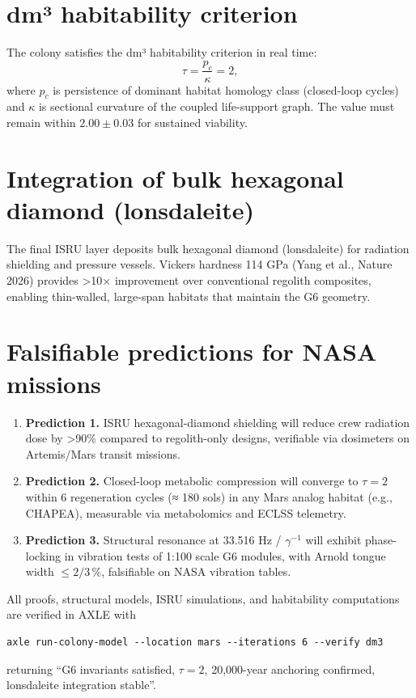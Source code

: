 \documentclass[19pt]{book}
\theoremstyle{plain}
\theoremstyle{definition}
\theoremstyle{remark}
\begin{document}
\section{dm³ habitability criterion}

The colony satisfies the dm³ habitability criterion in real time:
\[
\tau = \frac{p_c}{\kappa} = 2,
\]
where \(p_c\) is persistence of dominant habitat homology class (closed-loop cycles) and \(\kappa\) is sectional curvature of the coupled life-support graph. The value must remain within \(2.00 \pm 0.03\) for sustained viability.

\section{Integration of bulk hexagonal diamond (lonsdaleite)}

The final ISRU layer deposits bulk hexagonal diamond (lonsdaleite) for radiation shielding and pressure vessels. Vickers hardness 114 GPa (Yang et al., Nature 2026) provides >10× improvement over conventional regolith composites, enabling thin-walled, large-span habitats that maintain the G6 geometry.

\section{Falsifiable predictions for NASA missions}

\begin{enumerate}
\item \textbf{Prediction 1.} ISRU hexagonal-diamond shielding will reduce crew radiation dose by >90\% compared to regolith-only designs, verifiable via dosimeters on Artemis/Mars transit missions.
\item \textbf{Prediction 2.} Closed-loop metabolic compression will converge to \(\tau = 2\) within 6 regeneration cycles (≈ 180 sols) in any Mars analog habitat (e.g., CHAPEA), measurable via metabolomics and ECLSS telemetry.
\item \textbf{Prediction 3.} Structural resonance at 33.516 Hz / \(\gamma^{-1}\) will exhibit phase-locking in vibration tests of 1:100 scale G6 modules, with Arnold tongue width \(\le 2/3\,\%\), falsifiable on NASA vibration tables.
\end{enumerate}

All proofs, structural models, ISRU simulations, and habitability computations are verified in AXLE with
\begin{verbatim}
axle run-colony-model --location mars --iterations 6 --verify dm3
\end{verbatim}
returning “G6 invariants satisfied, \(\tau=2\), 20,000-year anchoring confirmed, lonsdaleite integration stable”.
\end{document}
